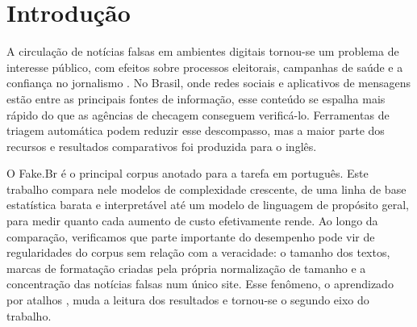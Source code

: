 \begin{abstract}
We compare, under a single protocol, four families of classifiers for Portuguese fake news detection on Fake.Br: TF-IDF statistical models, frozen embeddings, fine-tuned BERTimbau, and an open-weight LLM (Qwen2.5-7B) with in-context learning. Before comparing models, we quantify three corpus shortcuts: on full texts, length alone yields 94.2\% accuracy; in the size-normalized version, truncation leaves 93\% of true articles ending mid-sentence and four formatting cues reach 83.1\%; and 93\% of fake articles come from a single website. On normalized texts, a word-level SVM reaches 91.7\%, character n-grams 94.6\%, frozen BERTimbau 95.7\%, fine-tuned BERTimbau 99.5\%, and the LLM 78.4\% (calibrated few-shot). With formatting artifacts neutralized, fine-tuned BERTimbau keeps 98.7\% and is the only model that generalizes to minority sources. Evaluation on Fake.Br must control for length, formatting, and source for the numbers to reflect misinformation detection.
\end{abstract}

\section{Introdução}

A circulação de notícias falsas em ambientes digitais tornou-se um problema de interesse público, com efeitos sobre processos eleitorais, campanhas de saúde e a confiança no jornalismo \citep{shu2017,zhou2020}. No Brasil, onde redes sociais e aplicativos de mensagens estão entre as principais fontes de informação, esse conteúdo se espalha mais rápido do que as agências de checagem conseguem verificá-lo. Ferramentas de triagem automática podem reduzir esse descompasso, mas a maior parte dos recursos e resultados comparativos foi produzida para o inglês.

O Fake.Br \citep{monteiro2018} é o principal corpus anotado para a tarefa em português. Este trabalho compara nele modelos de complexidade crescente, de uma linha de base estatística barata e interpretável até um modelo de linguagem de propósito geral, para medir quanto cada aumento de custo efetivamente rende. Ao longo da comparação, verificamos que parte importante do desempenho pode vir de regularidades do corpus sem relação com a veracidade: o tamanho dos textos, marcas de formatação criadas pela própria normalização de tamanho e a concentração das notícias falsas num único site. Esse fenômeno, o aprendizado por atalhos \citep{geirhos2020}, muda a leitura dos resultados e tornou-se o segundo eixo do trabalho.

